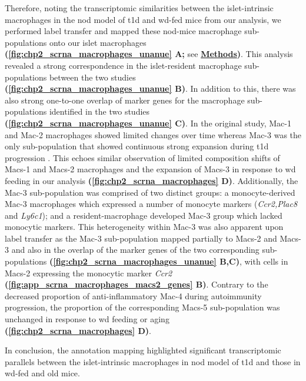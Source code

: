 \par Therefore, noting the transcriptomic similarities between the islet-intrinsic macrophages in the \gls{nod} model of \gls{t1d} and \gls{wd}-fed mice from our analysis, we performed label transfer and mapped these \gls{nod}-mice macrophage sub-populations onto our islet macrophages \textbf{(\autoref{fig:chp2_scrna_macrophages_unanue} A;} see \hyperref[subsubsec:met_chp2_labeltransfer]{\textbf{Methods}}\textbf{)}. This analysis revealed a strong correspondence in the islet-resident macrophage sub-populations between the two studies \textbf{(\autoref{fig:chp2_scrna_macrophages_unanue} B)}. In addition to this, there was also strong one-to-one overlap of marker genes for the macrophage sub-populations identified in the two studies \textbf{(\autoref{fig:chp2_scrna_macrophages_unanue} C)}. In the original study, Mac-1 and Mac-2 macrophages showed limited changes over time whereas Mac-3 was the only sub-population that showed continuous strong expansion during \gls{t1d} progression \textbf{\cite{zakharov_single-cell_2020}}. This echoes similar observation of limited composition shifts of Macs-1 and Macs-2 macrophages and the expansion of Macs-3 in response to \gls{wd} feeding in our analysis \textbf{(\autoref{fig:chp2_scrna_macrophages} D)}. Additionally, the Mac-3 sub-population was comprised of two distinct groups: a monocyte-derived Mac-3 macrophages which expressed a number of monocyte markers (\textit{Ccr2,Plac8} and \textit{Ly6c1}); and a resident-macrophage developed Mac-3 group which lacked monocytic markers. This heterogeneity within Mac-3 was also apparent upon label transfer as the Mac-3 sub-population mapped partially to Macs-2 and Macs-3 and also in the overlap of the marker genes of the two corresponding sub-populations \textbf{(\autoref{fig:chp2_scrna_macrophages_unanue} B,C)}, with cells in Macs-2 expressing the monocytic marker \textit{Ccr2} \textbf{(\autoref{fig:app_scrna_macrophages_macs2_genes} B)}. Contrary to the decreased proportion of anti-inflammatory Mac-4 during autoimmunity progression, the proportion of the corresponding Macs-5 sub-population was unchanged in response to \gls{wd} feeding or aging \textbf{(\autoref{fig:chp2_scrna_macrophages} D)}.\\

\par In conclusion, the annotation mapping highlighted significant transcriptomic parallels between the islet-intrinsic macrophages in \gls{nod} model of \gls{t1d} and those in \gls{wd}-fed and old mice. 



